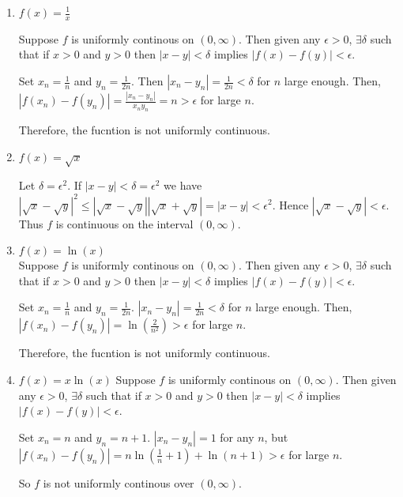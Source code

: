 \documentclass{tufte-book}
\theoremstyle{mytheoremstyle}
\theoremstyle{mylemstyle}
\theoremstyle{mydefstyle}
\begin{document}
\begin{enumerate}

\item $f(x) = \frac{1}{x}$

Suppose $f$ is uniformly continous on $(0, \infty)$.  Then given any $\epsilon > 0$, $\exists \delta$ such that if $x>0$ and $y>0$ then $|x - y| < \delta$ implies $|f(x) - f(y)| < \epsilon$.

Set $x_n = \frac{1}{n}$ and $y_n=\frac{1}{2n}$.  Then $|x_n - y_n| = \frac{1}{2n} <  \delta$ for $n$ large enough.  Then, $|f(x_n) - f(y_n)| = \frac{|x_n-y_n|}{x_ny_n} = n > \epsilon$ for large $n$.

Therefore, the fucntion is not uniformly continuous.

\item $f(x) = \sqrt{x}$

Let $\delta = \epsilon^2$.  If $|x - y| < \delta = \epsilon^2$ we have $|\sqrt{x} - \sqrt{y}|^2 \leq |\sqrt{x} - \sqrt{y}||\sqrt{x} + \sqrt{y}| = |x-y| < \epsilon^2$.  Hence $|\sqrt{x} - \sqrt{y}| < \epsilon$.  Thus $f$ is continuous on the interval $(0, \infty)$.

\item $f(x) = \ln(x)$\\
Suppose $f$ is uniformly continous on $(0, \infty)$.  Then given any $\epsilon > 0$, $\exists \delta$ such that if $x>0$ and $y>0$ then $|x - y| < \delta$ implies $|f(x) - f(y)| < \epsilon$.

Set $x_n = \frac{1}{n}$ and $y_n = \frac{1}{2n}$.   $|x_n - y_n| = \frac{1}{2n} <  \delta$ for $n$ large enough.  Then, $|f(x_n) - f(y_n)| = \ln(\frac{2}{n^2}) > \epsilon$ for large $n$.

Therefore, the fucntion is not uniformly continuous.

\item $f(x) = x \ln(x)$
Suppose $f$ is uniformly continous on $(0, \infty)$.  Then given any $\epsilon > 0$, $\exists \delta$ such that if $x>0$ and $y>0$ then $|x - y| < \delta$ implies $|f(x) - f(y)| < \epsilon$.

Set $x_n = n$ and $y_n = n+1$.   $|x_n - y_n| = 1$ for any $n$, but $|f(x_n) - f(y_n)| = n \ln(\frac{1}{n} + 1) + \ln(n+1) > \epsilon$ for large $n$.

So $f$ is not uniformly continous over $(0, \infty)$.
\end{enumerate}
\end{document}

